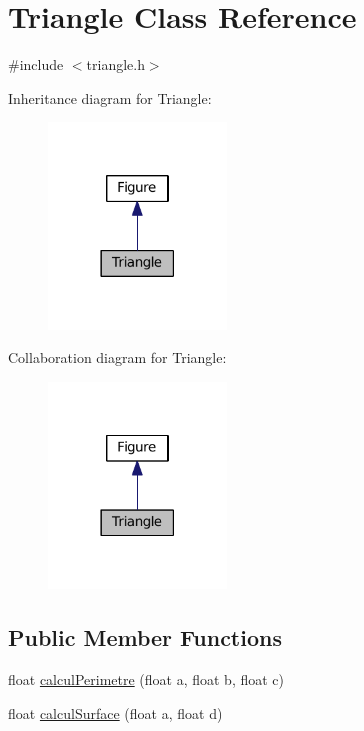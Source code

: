 \hypertarget{classTriangle}{}\section{Triangle Class Reference}
\label{classTriangle}


{\ttfamily \#include $<$triangle.\+h$>$}



Inheritance diagram for Triangle\+:
\nopagebreak
\begin{figure}[H]
\begin{center}
\leavevmode
\includegraphics[width=134pt]{classTriangle__inherit__graph}
\end{center}
\end{figure}


Collaboration diagram for Triangle\+:
\nopagebreak
\begin{figure}[H]
\begin{center}
\leavevmode
\includegraphics[width=134pt]{classTriangle__coll__graph}
\end{center}
\end{figure}
\subsection*{Public Member Functions}
\begin{DoxyCompactItemize}
\item 
float \hyperlink{classTriangle_afeb2eb1920e4a0d0f376c32b7797e766}{calcul\+Perimetre} (float a, float b, float c)
\item 
float \hyperlink{classTriangle_abf1ce3d4215d2f66f7030a569634a40a}{calcul\+Surface} (float a, float d)
\end{DoxyCompactItemize}
